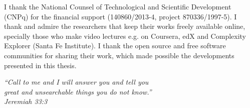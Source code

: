 \documentclass[
12pt,		%
openright,	%
twoside,  %
a4paper,			%
chapter=TITLE,		%
english,			%
french,				%
spanish,			%
brazil				%
]{USPSC}
\begin{document}
\begin{agradecimentos}
I thank the National Counsel of Technological and Scientific Development (CNPq)
for the financial support (140860/2013-4, project 870336/1997-5).
I thank and admire the researchers that keep their works freely available online,
specially those who make video lectures e.g. on Coursera, edX and Complexity Explorer (Santa Fe Institute).
I thank the open source and free software communities for sharing their work,
which made possible the developments presented in this thesis.
% 
% 
% 
\end{agradecimentos}

\begin{epigrafe}
    \vspace*{\fill}
	\begin{flushright}
		\textit{``Call to me and I will answer you and tell you\\
		great and unsearchable things you do not know.''\\
		Jeremiah 33:3}
	\end{flushright}
\end{epigrafe}
\end{document}
